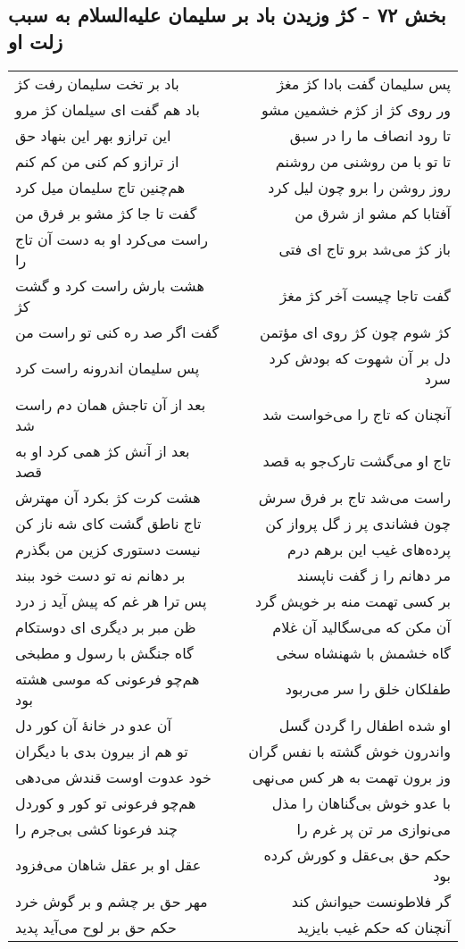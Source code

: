 \begin{center}
\section*{بخش ۷۲ - کژ وزیدن باد بر سلیمان علیه‌السلام به سبب زلت او}
\label{sec:sh072}
\begin{longtable}{l p{0.5cm} r}
باد بر تخت سلیمان رفت کژ
&&
پس سلیمان گفت بادا کژ مغژ
\\
باد هم گفت ای سیلمان کژ مرو
&&
ور روی کژ از کژم خشمین مشو
\\
این ترازو بهر این بنهاد حق
&&
تا رود انصاف ما را در سبق
\\
از ترازو کم کنی من کم کنم
&&
تا تو با من روشنی من روشنم
\\
هم‌چنین تاج سلیمان میل کرد
&&
روز روشن را برو چون لیل کرد
\\
گفت تا جا کژ مشو بر فرق من
&&
آفتابا کم مشو از شرق من
\\
راست می‌کرد او به دست آن تاج را
&&
باز کژ می‌شد برو تاج ای فتی
\\
هشت بارش راست کرد و گشت کژ
&&
گفت تاجا چیست آخر کژ مغژ
\\
گفت اگر صد ره کنی تو راست من
&&
کژ شوم چون کژ روی ای مؤتمن
\\
پس سلیمان اندرونه راست کرد
&&
دل بر آن شهوت که بودش کرد سرد
\\
بعد از آن تاجش همان دم راست شد
&&
آنچنان که تاج را می‌خواست شد
\\
بعد از آنش کژ همی کرد او به قصد
&&
تاج او می‌گشت تارک‌جو به قصد
\\
هشت کرت کژ بکرد آن مهترش
&&
راست می‌شد تاج بر فرق سرش
\\
تاج ناطق گشت کای شه ناز کن
&&
چون فشاندی پر ز گل پرواز کن
\\
نیست دستوری کزین من بگذرم
&&
پرده‌های غیب این برهم درم
\\
بر دهانم نه تو دست خود ببند
&&
مر دهانم را ز گفت ناپسند
\\
پس ترا هر غم که پیش آید ز درد
&&
بر کسی تهمت منه بر خویش گرد
\\
ظن مبر بر دیگری ای دوستکام
&&
آن مکن که می‌سگالید آن غلام
\\
گاه جنگش با رسول و مطبخی
&&
گاه خشمش با شهنشاه سخی
\\
هم‌چو فرعونی که موسی هشته بود
&&
طفلکان خلق را سر می‌ربود
\\
آن عدو در خانهٔ آن کور دل
&&
او شده اطفال را گردن گسل
\\
تو هم از بیرون بدی با دیگران
&&
واندرون خوش گشته با نفس گران
\\
خود عدوت اوست قندش می‌دهی
&&
وز برون تهمت به هر کس می‌نهی
\\
هم‌چو فرعونی تو کور و کوردل
&&
با عدو خوش بی‌گناهان را مذل
\\
چند فرعونا کشی بی‌جرم را
&&
می‌نوازی مر تن پر غرم را
\\
عقل او بر عقل شاهان می‌فزود
&&
حکم حق بی‌عقل و کورش کرده بود
\\
مهر حق بر چشم و بر گوش خرد
&&
گر فلاطونست حیوانش کند
\\
حکم حق بر لوح می‌آید پدید
&&
آنچنان که حکم غیب بایزید
\\
\end{longtable}
\end{center}
